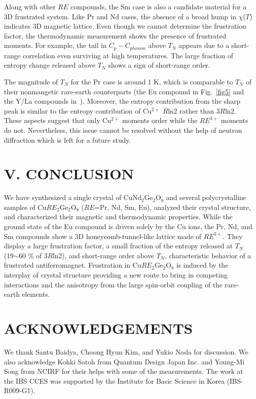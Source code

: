 \documentclass[aps,prl,reprint,amsmath,amssymb,superscriptaddress,showpacs]{revtex4-1}
\begin{document}
Along with other $RE$ compounds, the Sm case is also a candidate material for a 3D frustrated system. Like Pr and Nd cases, the absence of a broad hump in $\chi$($T$) indicates 3D magnetic lattice. Even though we cannot determine the frustration factor, the thermodynamic measurement shows the presence of frustrated moments. For example, the tail in $C_p-C_{phonon}$ above $T_N$ appears due to a short-range correlation even surviving at high temperatures. The large fraction of entropy change released above $T_N$ shows a sign of short-range order.

The magnitude of $T_N$ for the Pr case is around 1 K, which is comparable to $T_N$ of their nonmangetic
rare-earth counterparts (the Eu compound in Fig.~\ref{fig5} and the Y/La compounds in~\cite{H.Cho2017}). Moreover, the entropy contribution from the sharp peak is similar to the entropy contribution of Cu$^{2+}$ $R$ln2 rather than 3$R$ln2. These aspects suggest that only Cu$^{2+}$ moments order while the $RE^{3+}$ moments do not. Nevertheless, this issue cannot be resolved without the help of neutron diffraction which is left for a future study.

\section{V. CONCLUSION}
We have synthesized a single crystal of CuNd$_2$Ge$_2$O$_8$ and several polycrystalline samples of Cu$RE_2$Ge$_2$O$_8$ ($RE$=Pr, Nd, Sm, Eu), analyzed their crystal structure, and characterized their magnetic and thermodynamic properties. While the ground state of the Eu compound is driven solely by the Cu ions, the Pr, Nd, and Sm compounds show a 3D honeycomb-tunnel-like lattice made of $RE^{3+}$. They display a large frustration factor, a small fraction of the entropy released at $T_N$ (19$\sim$60 \% of 3$R$ln2), and short-range order above $T_N$, characteristic behavior of a frustrated antiferromagnet. Frustration in Cu$RE_2$Ge$_2$O$_8$ is induced by the interplay of crystal structure providing a new route to bring in competing interactions and the anisotropy from the large spin-orbit coupling of the rare-earth elements.

\section{ACKNOWLEDGEMENTS}
We thank Santu Baidya, Choong Hyun Kim, and Yukio Noda for discussion. We also acknowledge Kohki Satoh from Quantum Design Japan Inc. and Young-Mi Song from NCIRF for their helps with some of the measurements. The work at the IBS CCES was supported by the Institute for Basic Science in Korea (IBS-R009-G1).
\end{document}
